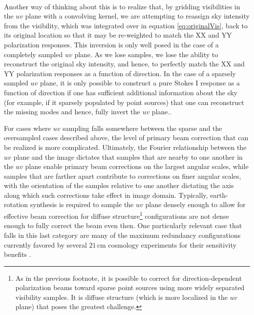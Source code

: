 \documentclass[twocolumn,apj,numberedappendix]{emulateapj}
\begin{document}
{\\
Another way of thinking about this is to realize that, by gridding visibilities
in the $uv$ plane with a convolving kernel, we are attempting to reassign sky
intensity from the visibility, which was integrated over in equation \ref{eq:originalVis}, back to
its original location so that it may be re-weighted to match the XX and YY
polarization responses.  This inversion is only well posed in the case of a
completely sampled $uv$ plane.  As we lose samples, we lose the ability to
reconstruct the original sky intensity, and hence, to perfectly match the XX
and YY polarization responses as a function of direction.  In the case of a
sparsely sampled $uv$ plane, it is only possible to construct a pure Stokes I
response as a function of direction if one has sufficient additional
information about the sky (for example, if it sparsely populated by point
sources) that one can reconstruct the missing modes and hence, fully invert the
$uv$ plane.}.

For cases where $uv$ sampling falls somewhere between the sparse and the oversampled cases described above, the level
of primary beam correction that can be realized is more complicated.  Ultimately, the Fourier relationship between
the $uv$ plane and the image dictates that samples that are nearby to one
another in the $uv$ plane enable primary beam corrections on the largest angular scales, while samples that are farther
apart contribute to corrections on finer angular scales, with the orientation of the samples relative to one another
dictating the axis along which such corrections take effect in image domain.  Typically, earth-rotation synthesis
is required to sample the $uv$ plane densely enough to allow for effective beam correction for
diffuse structure\footnote{
As in the previous footnote, it is possible to correct for direction-dependent polarization beams toward
sparse point sources using more widely separated visibility samples.  It is diffuse structure (which
is more localized in the $uv$ plane) that poses the greatest challenge.}
configurations are not dense enough to fully correct the beam even then.  One particularly relevant case that falls
in this last category are many of the maximum redundancy configurations currently favored by several $21\,\textrm{cm}$ cosmology experiments
for their sensitivity benefits \citep{parsons_et_al2012a,P14}.
\end{document}
